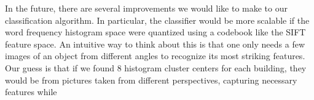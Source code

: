 In the future, there are several improvements we would like to make to our classification algorithm. 
In particular, the classifier would be more scalable if the word frequency histogram space were quantized using a codebook like the SIFT feature space. 
An intuitive way to think about this is that one only needs a few images of an object from different angles to recognize its most striking features.
Our guess is that if we found 8 histogram cluster centers for each building, they would be from pictures taken from different perspectives, capturing necessary features while 
